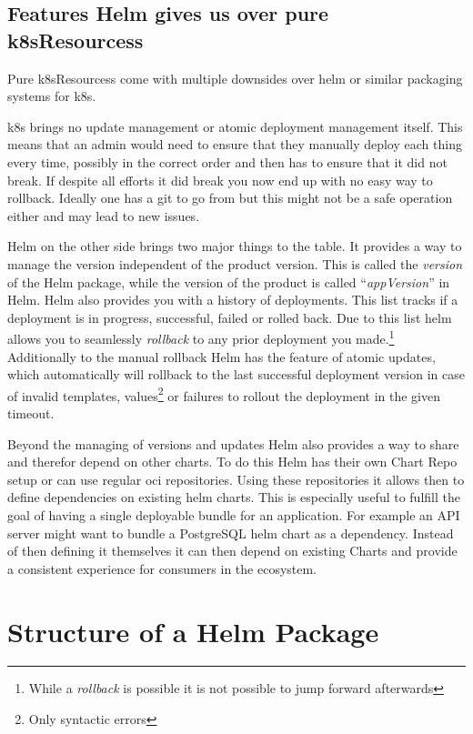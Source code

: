 \documentclass[english]{scrbook}
\begin{document}
\section{Features Helm gives us over pure \Glspl{k8sResources}}
Pure \Glspl{k8sResources} come with multiple downsides over helm or similar packaging systems for \Gls{k8s}.

\Gls{k8s} brings no update management or atomic deployment management itself.
This means that an admin would need to ensure that they manually deploy each thing every time, possibly in the correct order and then has to ensure that it did not break.
If despite all efforts it did break you now end up with no easy way to rollback.
Ideally one has a git to go from but this might not be a safe operation either and may lead to new issues.

Helm on the other side brings two major things to the table.
It provides a way to manage the version independent of the product version.
This is called the \emph{version} of the Helm package, while the version of the product is called \enquote{\emph{appVersion}} in Helm.
Helm also provides you with a history of deployments.
This list tracks if a deployment is in progress, successful, failed or rolled back.
Due to this list helm allows you to seamlessly \emph{rollback} to any prior deployment you made.\footnote{While a \emph{rollback} is possible it is not possible to jump forward afterwards}
Additionally to the manual rollback Helm has the feature of atomic updates, which automatically will rollback to the last successful deployment version in case of invalid templates, values\footnote{Only syntactic errors} or failures to rollout the deployment in the given timeout.

Beyond the managing of versions and updates Helm also provides a way to share and therefor depend on other charts.
To do this Helm has their own Chart Repo setup or can use regular \gls{oci} repositories.
Using these repositories it allows then to define dependencies on existing helm charts.
This is especially useful to fulfill the goal of having a single deployable bundle for an application.
For example an API server might want to bundle a PostgreSQL helm chart as a dependency.
Instead of then defining it themselves it can then depend on existing Charts and provide a consistent experience for consumers in the ecosystem.

\chapter{Structure of a Helm Package}
\end{document}
